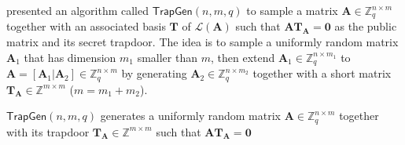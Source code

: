 \documentclass[cryptography,review,submit,pdftex,moreauthors,amsmath,amssymb,aps,strict]{Definitions/mdpi}
\let\oldalgorithmic\algorithmic
\let\endoldalgorithmic\endalgorithmic
\renewenvironment{algorithmic}
{\begin{adjustwidth}{-1em}{}\oldalgorithmic}
{\endoldalgorithmic\end{adjustwidth}}
\begin{document}
\cite{AP09} presented an algorithm called $\mathsf{TrapGen}(n,m,q)$ to sample a matrix $\mathbf{A}\in\mathbb{Z}_q^{n\times m}$ together with an associated basis $\mathbf{T}$ of $\mathcal{L}({\mathbf{A}})$ such that $\mathbf{A}\mathbf{T}_{\mathbf{A}} = \mathbf{0}$ as the public matrix and its secret trapdoor. The idea is to sample a uniformly random matrix $\mathbf{A}_1$ that has dimension $m_1$ smaller than $m$, then extend $\mathbf{A}_1\in\mathbb{Z}^{n\times m_1}_q$ to $\mathbf{A}=[\mathbf{A}_1|\mathbf{A}_2]\in\mathbb{Z}^{n\times m}_q$ by generating $\mathbf{A}_2\in\mathbb{Z}^{n\times m_2}_q$ together with a short matrix $\mathbf{T}_{\mathbf{A}}\in\mathbb{Z}^{m\times m}$ ($m=m_1+m_2$).
\begin{algorithm}[H]
	\begin{algorithmic}
        \State{}
		\EndFunction
	\end{algorithmic}
	\caption{$\mathsf{TrapGen}(n,m,q)$ generates a uniformly random matrix $\mathbf{A}\in\mathbb{Z}^{n\times m}_q$ together with its trapdoor $\mathbf{T}_\mathbf{A}\in\mathbb{Z}^{m\times m}$ such that $\mathbf{A}\mathbf{T}_{\mathbf{A}}=\mathbf{0}$} \label{alg:random_subset}
\end{algorithm}
\end{document}

